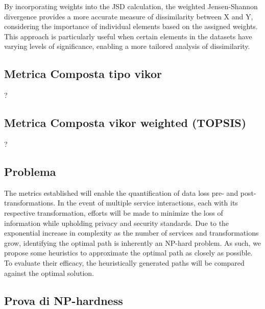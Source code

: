 By incorporating weights into the JSD calculation, the weighted Jensen-Shannon divergence provides a more accurate measure of dissimilarity between X and Y, considering the importance of individual elements based on the assigned weights. This approach is particularly useful when certain elements in the datasets have varying levels of significance, enabling a more tailored analysis of dissimilarity.
\subsection{Metrica Composta tipo vikor}
?
\subsection{Metrica Composta vikor weighted (TOPSIS)}
?

\subsection{Problema}
The metrics established will enable the quantification of data loss pre- and post-transformations.
In the event of multiple service interactions, each with its respective transformation, efforts will be made to minimize the loss of information while upholding privacy and security standards.
Due to the exponential increase in complexity as the number of services and transformations grow, identifying the optimal path is inherently an NP-hard problem.
As such, we propose some heuristics to approximate the optimal path as closely as possible. To evaluate their efficacy, the heuristically generated paths will be compared against the optimal solution.
\subsection{Prova di NP-hardness}

